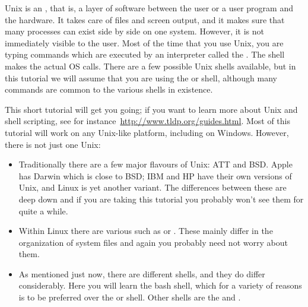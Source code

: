 
Unix is an , that is, a layer of software
between the user or a user program and the hardware. It takes care of
files and screen output, and it makes sure that many processes can exist
side by side on one system. However, it is not immediately visible to
the user.
%
Most of the time that you use Unix, you are typing commands which are
executed by an interpreter called the . The shell
makes the actual \ac{OS} calls. There are a few possible Unix shells
available, but in this tutorial we will assume that you are using the
 or  shell, although many commands are
common to the various shells in existence.

This short tutorial will get you going; 
if you want to learn more about Unix and shell scripting,
see for instance~\url{http://www.tldp.org/guides.html}.
Most of this tutorial will work on any Unix-like platform,
including  on Windows.
However, there is not just one Unix:
\begin{itemize}
\item Traditionally there are a few major flavours of Unix: ATT and BSD.
  Apple has Darwin which is close to BSD; IBM and HP have their own
  versions of Unix, and Linux is yet another variant. The differences between
  these are deep down and if you are taking this tutorial you probably
  won't see them for quite a while.
\item Within Linux there are various 
  such as  or . These mainly differ
  in the organization of system files and again you probably need not worry
  about them.
\item As mentioned just now, there are different shells, and they do differ
  considerably. Here you will learn the bash shell, which for a variety of
  reasons is to be preferred over the  or  shell.
  Other shells are the  and .
\end{itemize}

